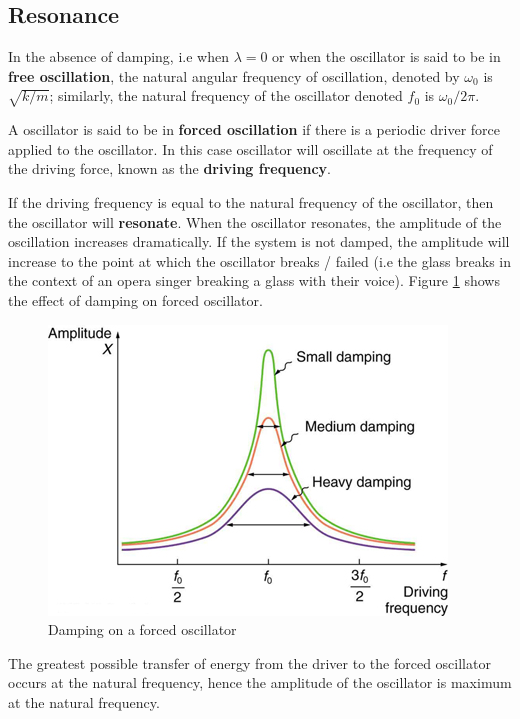 \subsection{Resonance}

In the absence of damping, i.e when $\lambda = 0$ or when the oscillator is said to be in \textbf{free oscillation}, the natural angular frequency of oscillation, denoted by $\omega_0$ is $\sqrt{k/m}$; similarly, the natural frequency of the oscillator denoted $f_0$ is $\omega_0/2\pi$. 

A oscillator is said to be in \textbf{forced oscillation} if there is a periodic driver force applied to the oscillator. In this case oscillator will oscillate at the frequency of the driving force, known as the \textbf{driving frequency}. 

If the driving frequency is equal to the natural frequency of the oscillator, then the oscillator will \textbf{resonate}. When the oscillator resonates, the amplitude of the oscillation increases dramatically. If the system is not damped, the amplitude will increase to the point at which the oscillator breaks / failed (i.e the glass breaks in the context of an opera singer breaking a glass with their voice). Figure \ref{fig:resonance} shows the effect of damping on forced oscillator. 

\begin{figure}[h!]
    \centering
    \includegraphics[scale=1.2]{notes/images/Resonance.JPG}
    \caption{Damping on a forced oscillator}
    \label{fig:resonance}
\end{figure}
\FloatBarrier


The greatest possible transfer of energy from the driver to the forced oscillator occurs at the natural frequency, hence the amplitude of the oscillator is maximum at the natural frequency. 

